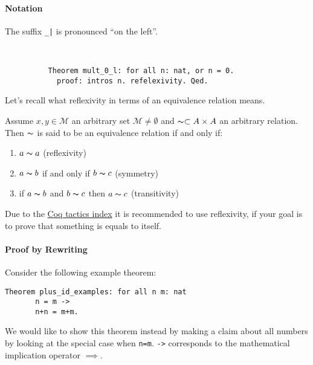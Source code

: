      \paragraph{Notation} 
     The suffix \lstinline!_|! is pronounced ``on the left''. 
     \begin{example} ~\ \vspace{-5mm}
	     \begin{lstlisting} 
	      Theorem mult_0_l: for all n: nat, or n = 0.
	        proof: intros n. refelexivity. Qed.
	     \end{lstlisting}
     \end{example} 
  
   Let's recall what reflexivity in terms of an equivalence relation means.  
   \begin{definition}
   Assume $x,y\in \mathcal{M}$ an arbitrary set $\mathcal{M}\neq\emptyset$ and $\thicksim\subset A \times A $ an arbitrary relation.
   Then $\thicksim$ is said to be an equivalence relation if and only if:
   \begin{enumerate}
   \item $a\thicksim a$ (reflexivity)
   \item $a \thicksim b$ if and only if $b \thicksim c$ (symmetry)
   \item if $a \thicksim b$ and $ b\thicksim c$ then $a \thicksim c$ (transitivity) 
   \end{enumerate}
   \end{definition}
     
   Due to the \href{https://pjreddie.com/coq-tactics/}{Coq tactics index} it is recommended to use reflexivity, if your goal is to prove that something is equals to itself.  
      
     \paragraph{Proof by Rewriting}
     
     Consider the following example theorem:     
	 \begin{lstlisting}[caption=Example]
	 Theorem plus_id_examples: for all n m: nat
       n = m -> 
	   n+n = m+m.	 
	 \end{lstlisting}  
	
	 We would like to show this theorem instead by making a claim about all numbers by looking at the special case when \lstinline!n=m!.
     \lstinline!->! corresponds to the mathematical implication operator $\implies$. 
     
